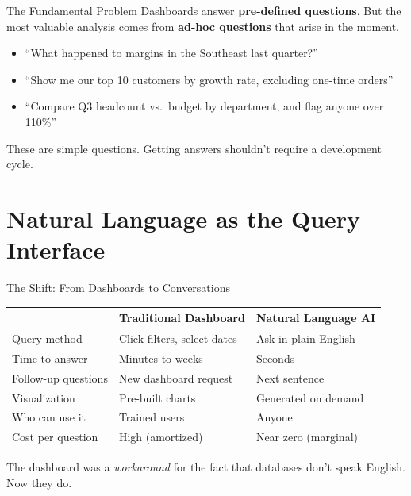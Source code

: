 \documentclass[aspectratio=169]{beamer}
\begin{document}
\begin{frame}{The Fundamental Problem}
Dashboards answer \textbf{pre-defined questions}. But the most valuable analysis comes from \textbf{ad-hoc questions} that arise in the moment.
\vspace{0.3cm}
\begin{itemize}
  \item ``What happened to margins in the Southeast last quarter?''
  \item ``Show me our top 10 customers by growth rate, excluding one-time orders''
  \item ``Compare Q3 headcount vs.\ budget by department, and flag anyone over 110\%''
\end{itemize}
\vspace{0.3cm}
These are simple questions. Getting answers shouldn't require a development cycle.
\end{frame}

\section{Natural Language as the Query Interface}

\begin{frame}{The Shift: From Dashboards to Conversations}
\begin{center}
\begin{tabular}{@{} l l l @{}}
\toprule
& \textbf{Traditional Dashboard} & \textbf{Natural Language AI} \\
\midrule
Query method & Click filters, select dates & Ask in plain English \\
Time to answer & Minutes to weeks & Seconds \\
Follow-up questions & New dashboard request & Next sentence \\
Visualization & Pre-built charts & Generated on demand \\
Who can use it & Trained users & Anyone \\
Cost per question & High (amortized) & Near zero (marginal) \\
\bottomrule
\end{tabular}
\end{center}
\vspace{0.3cm}
\centering
The dashboard was a \textit{workaround} for the fact that databases don't speak English. Now they do.
\end{frame}
\end{document}
